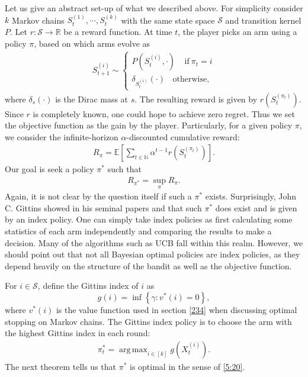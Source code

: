 \documentclass[letterpaper,11pt,openright,openany]{book}
\numberwithin{equation}{section}
\theoremstyle{plain}
\theoremstyle{definition}
\def\R{{\mathbb R}}
\def\N{{\mathbb N}}
\def\E{{\mathbb E}}
\def\R{{\mathbb R}}
\def\S{{\mathcal S}}
\DeclareMathOperator*{\argmax}{arg\,max}
\begin{document}
Let us give an abstract set-up of what we described above. For simplicity consider $k$ Markov chains $S_t^{(1)}, \cdots, S_t^{(k)}$ with the same state space $\S$ and transition kernel $P$. Let $r:\S\to\R$ be a reward function. At time $t$, the player picks an arm using a policy $\pi$, based on which arms evolve as
\begin{align*}
S_{t+1}^{(i)}\sim
\begin{cases}
P(S_{t}^{(i)}, \cdot)\ \ \ \ \ \text{if} \ \pi_t = i\\
\delta_{S_{t}^{(i)}}(\cdot)\ \ \ \ \text{otherwise},
\end{cases}
\end{align*} 
where $\delta_s(\cdot)$ is the Dirac mass at $s$. The resulting reward is given by $r(S_t^{(\pi_t)})$. Since $r$ is completely known, one could hope to achieve zero regret. Thus we set the objective function as the gain by the player. Particularly, for a given policy $\pi$, we consider the infinite-horizon $\alpha$-discounted cumulative reward:
\begin{align*}
R_\pi = \E\left[\sum_{t\in\N}\alpha^{t-1}r(S_t^{(\pi_t)})\right].
\end{align*} 
Our goal is seek a policy $\pi^*$ such that 
\begin{align}
R_{\pi^*}=\sup_{\pi}R_{\pi}.\label{5:20}
\end{align} 
Again, it is not clear by the question itself if such a $\pi^*$ exists. 
Surprisingly, John C. Gittins showed in his seminal papers \cite{gittins1974dynamic} and \cite{gittins1979bandit} that such $\pi^*$ does exist and is given by an index policy.
One can simply take index policies as first calculating some statistics of each arm independently and comparing the results to make a decision. Many of the algorithms such as UCB fall within this realm.
However, we should point out that not all Bayesian optimal policies are index policies, as they depend heavily on the structure of the bandit as well as the objective function. 

For $i\in\S$, define the Gittins index of $i$ as $$g(i)=\inf\left\{\gamma: v^*(i)= 0\right\},$$ where $v^*(i)$ is the value function used in section \ref{234} when discussing optimal stopping on Markov chains.  The Gittins index policy is to choose the arm with the highest Gittins index in each round:
\begin{align}
\pi^*_t = \argmax_{i\in [k]}g(X_t^{(i)}). \label{5:21}
\end{align}
The next theorem tells us that $\pi^*$ is optimal in the sense of \eqref{5:20}. 
\end{document}
